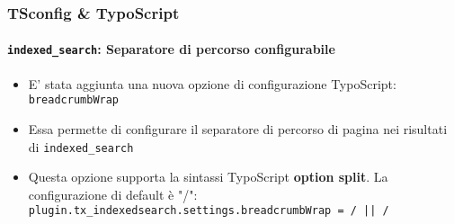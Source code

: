 \begin{frame}[fragile]
	\frametitle{TSconfig \& TypoScript}
	\framesubtitle{\texttt{indexed\_search}: Separatore di percorso configurabile}

	\lstset{basicstyle=\tiny\ttfamily}

	\begin{itemize}

		\item E' stata aggiunta una nuova opzione di configurazione TypoScript: \texttt{breadcrumbWrap}

		\item Essa permette di configurare il separatore di percorso di pagina nei risultati di \texttt{indexed\_search}

		\item Questa opzione supporta la sintassi TypoScript \textbf{option split}.\newline
			La configurazione di default è "/":\newline
			\small
				\texttt{plugin.tx\_indexedsearch.settings.breadcrumbWrap = / || /}
			\normalsize

	\end{itemize}

\end{frame}

